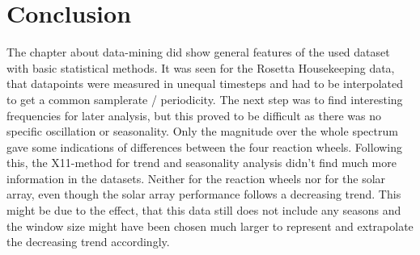 \section{Conclusion}
The chapter about data-mining did show general features of the used dataset with basic statistical methods. It was seen for the Rosetta Housekeeping data, that datapoints were measured in unequal timesteps and had to be interpolated to get a common samplerate / periodicity. The next step was to find interesting frequencies for later analysis, but this proved to be difficult as there was no specific oscillation or seasonality. Only the magnitude over the whole spectrum gave some indications of differences between the four reaction wheels.
Following this, the X11-method for trend and seasonality analysis didn't find much more information in the datasets. Neither for the reaction wheels nor for the solar array, even though the solar array performance follows a decreasing trend. This might be due to the effect, that this data still does not include any seasons and the window size might have been chosen much larger to represent and extrapolate the decreasing trend accordingly.